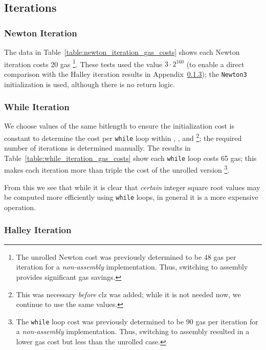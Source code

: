 

\subsection{Iterations}
\label{app_gas_costs:iterations}



\subsubsection{Newton Iteration}
\label{app_gas_costs:newton}

The data in Table~\ref{table:newton_iteration_gas_costs}
shows each Newton iteration costs 20 gas%
\footnote{The unrolled Newton cost was previously determined to be
48 gas per iteration for a \emph{non-assembly} implementation.
Thus, switching to assembly provides significant gas savings.}.
These tests used the value $3\cdot2^{160}$
(to enable a direct comparison with the Halley iteration results
in Appendix~\ref{app_gas_costs:halley});
the \texttt{Newton3} initialization is used,
although there is no return logic.

\subsubsection{While Iteration}
\label{app_gas_costs:while}

We choose values of the same bitlength
to ensure the initialization cost is constant
to determine the cost per \texttt{while} loop
within \WhileOne{}, \WhileTwo{}, and \WhileThree{}%
\footnote{This was necessary \emph{before} \textsf{clz} was added;
while it is not needed now, we continue to use the same values.};
the required number of iterations is determined manually.
The results in Table~\ref{table:while_iteration_gas_costs}
show each \texttt{while} loop costs 65 gas;
this makes each iteration more than triple the cost
of the unrolled version%
\footnote{The \texttt{while} loop cost was previously determined to be 90 gas
per iteration for a \emph{non-assembly} implementation.
Thus, switching to assembly resulted in a lower gas cost
but less than the unrolled case.}.

From this we see that while it is clear that \emph{certain}
integer square root values may be computed more efficiently
using \texttt{while} loops,
in general it is a more expensive operation.

\subsubsection{Halley Iteration}
\label{app_gas_costs:halley}


